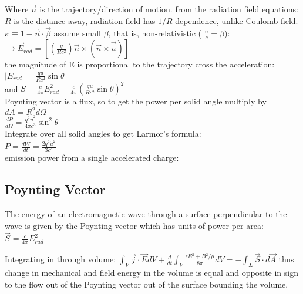 \documentclass[12pt]{report}
\begin{document}
Where $\vec{n}$ is the trajectory/direction of motion.
from the radiation field equations:\\
$R$ is the distance away,  radiation field has $1/R$ dependence, unlike Coulomb field.\\
\(\kappa\equiv 1-\vec{n}\cdot\vec{\beta}\) 
assume small $\beta$, that is, non-relativistic ( \(\frac{u}{c}=\beta\)):\\
\(\rightarrow \vec{E}_{rad}=[(\frac{q}{Rc^2})\vec{n}\times(\vec{n}\times\vec{\dot{u}})]\)\\
the magnitude of E is proportional to the trajectory cross the acceleration:\\
\(|E_{rad}|=\frac{q\dot{u}}{Rc^2}\sin\theta\)\\

and \(S=\frac{c}{4\pi}E_{rad}^2=\frac{c}{4\pi}(\frac{q\dot{u}}{Rc^2}\sin\theta)^2\)\\

Poynting vector is a flux, so to get the power per solid angle multiply by $dA=R^2d\Omega$\\

\(\frac{dP}{d\Omega}=\frac{q^2\dot{u}^2}{4\pi c^3}\sin^2\theta\)\\

Integrate over all solid angles to get Larmor's formula:\\
\(\boxed{ P=\frac{dW}{dt}=\frac{2q^2\dot{u}^2}{3c^3}}\)\\ 
emission power from a single accelerated charge:\\

 
 \subsection{Poynting Vector}
The energy of an electromagnetic wave through a surface perpendicular to the wave is given by the Poynting vector which has units of power per area: \\
\(\boxed{\vec{S}=\frac{c}{4\pi}E_{rad}^2}\)


 Integrating in through volume: 
 $ \int_V \vec{j}\cdot\vec{E} dV +\frac{d}{dt}\int_V\frac{\epsilon E^2 +B^2/\mu}{8\pi}dV=-\int_\Sigma \vec{S}\cdot d\vec{A} $ 
 thus change in mechanical and field energy in the volume is equal and opposite in sign to the flow out of the Poynting vector out of the surface bounding the volume. \\
 
\end{document}
